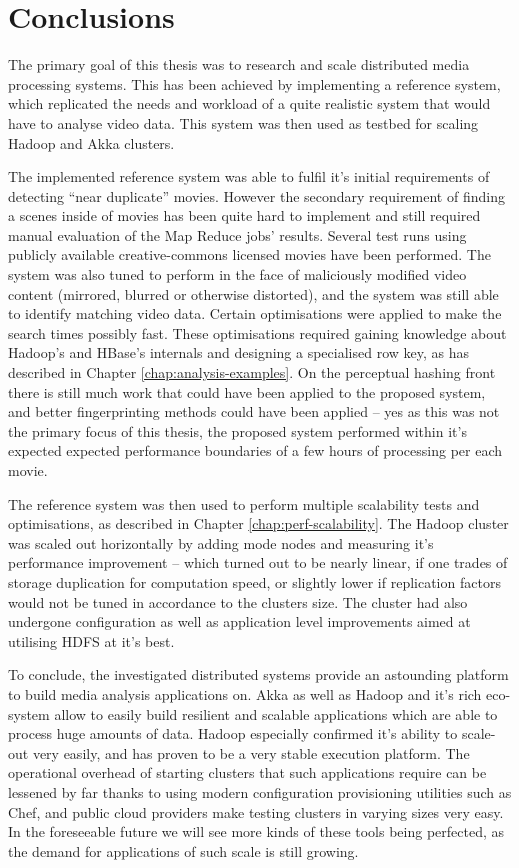 \chapter{Conclusions}
\label{chap:conclusions}

The primary goal of this thesis was to research and scale distributed media processing systems. This has been achieved by implementing a reference system, which replicated the needs and workload of a quite realistic system that would have to analyse video data. This system was then used as testbed for scaling Hadoop and Akka clusters.

The implemented reference system was able to fulfil it's initial requirements of detecting ``near duplicate'' movies.
However the secondary requirement of finding a scenes inside of movies has been quite hard to implement and still required manual evaluation of the Map Reduce jobs' results. Several test runs using publicly available creative-commons licensed movies have been performed. The system was also tuned to perform in the face of maliciously modified video content (mirrored, blurred or otherwise distorted), and the system was still able to identify matching video data. Certain optimisations were applied to make the search times possibly fast. These optimisations required gaining knowledge about Hadoop's and HBase's internals and designing a specialised row key, as has described in Chapter \ref{chap:analysis-examples}. On the perceptual hashing front there is still much work that could have been applied to the proposed system, and better fingerprinting methods could have been applied -- yes as this was not the primary focus of this thesis, the proposed system performed within it's expected expected performance boundaries of a few hours of processing per each movie.

The reference system was then used to perform multiple scalability tests and optimisations, as described in Chapter \ref{chap:perf-scalability}. The Hadoop cluster was scaled out horizontally by adding mode nodes and measuring it's performance improvement -- which turned out to be nearly linear, if one trades of storage duplication for computation speed, or slightly lower if replication factors would not be tuned in accordance to the clusters size. The cluster had also undergone configuration as well as application level improvements aimed at utilising HDFS at it's best.

To conclude, the investigated distributed systems provide an astounding platform to build media analysis applications on. Akka as well as Hadoop and it's rich eco-system allow to easily build resilient and scalable applications which are able to process huge amounts of data. Hadoop especially confirmed it's ability to scale-out very easily, and has proven to be a very stable execution platform. The operational overhead of starting clusters that such applications require can be lessened by far thanks to using modern configuration provisioning utilities such as Chef, and public cloud providers make testing clusters in varying sizes very easy. In the foreseeable future we will see more kinds of these tools being perfected, as the demand for applications of such scale is still growing.